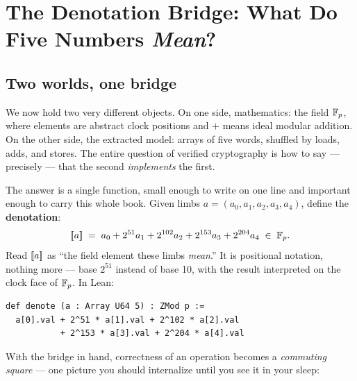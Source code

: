 \chapter{The Denotation Bridge: What Do Five Numbers \emph{Mean}?}
\label{ch:denotation}

\section{Two worlds, one bridge}

We now hold two very different objects. On one side, mathematics:
the field $\mathbb{F}_p$, where elements are abstract clock positions and $+$ means
ideal modular addition. On the other side, the extracted model: arrays of
five  words, shuffled by loads, adds, and stores. The entire
question of verified cryptography is how to say --- precisely --- that the
second \emph{implements} the first.

The answer is a single function, small enough to write on one line and
important enough to carry this whole book. Given limbs
$a = (a_0, a_1, a_2, a_3, a_4)$, define the \textbf{denotation}:
\[
[\mkern-3.3mu[ a ]\mkern-3.3mu] \;=\; a_0 + 2^{51} a_1 + 2^{102} a_2 + 2^{153} a_3 + 2^{204} a_4
\;\in\; \mathbb{F}_p .
\]
Read $[\mkern-3.3mu[ a ]\mkern-3.3mu]$ as ``the field element these limbs \emph{mean}.'' It is
positional notation, nothing more --- base $2^{51}$ instead of base 10, with
the result interpreted on the clock face of $\mathbb{F}_p$. In Lean:

\begin{lstlisting}[language=Lean]
def denote (a : Array U64 5) : ZMod p :=
  a[0].val + 2^51 * a[1].val + 2^102 * a[2].val
           + 2^153 * a[3].val + 2^204 * a[4].val
\end{lstlisting}

With the bridge in hand, correctness of an operation becomes a
\emph{commuting square} --- one picture you should internalize until you see
it in your sleep:

\begin{center}
\end{center}

